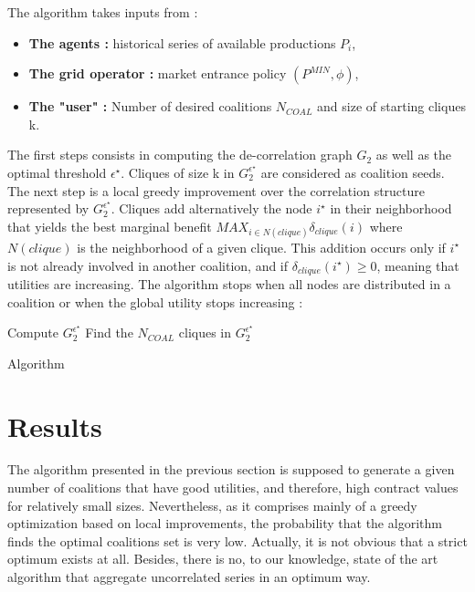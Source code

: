 \documentclass[conference]{IEEEtran}
\begin{document}
The algorithm takes inputs from :
\begin{itemize}
	\item \textbf{The agents :} historical series of available productions $P_{i}$, 
	\item \textbf{The grid operator :} market entrance policy $ (P^{MIN},\phi) $,
	\item \textbf{The "user" :} Number of desired coalitions $ N_{COAL} $ and size of starting cliques k.
\end{itemize} 
The first steps consists in computing the de-correlation graph $ G_{2} $ as well as the optimal threshold $ \epsilon^{\star} $. Cliques of size k in $ G_{2}^{\epsilon^{\star}} $ are considered as coalition seeds. The next step is a local greedy improvement over the correlation structure represented by  $ G_{2}^{\epsilon^{\star}} $. Cliques add alternatively the node $ i^{\star} $ in their neighborhood that yields the best marginal benefit $ MAX_{ i \in N(clique) } \delta_{clique}(i) $ where $ N(clique) $ is the neighborhood of a given clique. This addition occurs only if $ i^{\star} $ is not already involved in another coalition, and if $ \delta_{clique}(i^{\star}) \geq 0 $, meaning that utilities are increasing. The algorithm stops when all nodes are distributed in a coalition or when the global utility stops increasing :

\begin{algorithm}
 Compute $ G_{2}^{\epsilon^{\star}} $ \;
 Find the $ N_{COAL} $ cliques in $ G_{2}^{\epsilon^{\star}} $\;
 \caption{Algorithm}
\end{algorithm}

\section{Results}

The algorithm presented in the previous section is supposed to generate a given number of coalitions that have good utilities, and therefore, high contract values for relatively small sizes. Nevertheless, as it comprises mainly of a greedy optimization based on local improvements, the probability that the algorithm finds the optimal coalitions set is very low. Actually, it is not obvious that a strict optimum exists at all. Besides, there is no, to our knowledge, state of the art algorithm that aggregate uncorrelated series in an optimum way.
\end{document}
